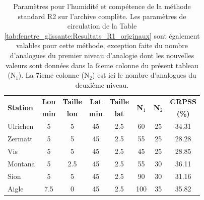 \documentclass[hess]{copernicus}
\begin{document}
\begin{table}[htb]
	\caption{Paramètres pour l'humidité et compétence de la méthode standard R2 sur l'archive complète. Les paramètres de circulation de la Table \ref{tab:fenetre_glissante:Resultats_R1_originaux} sont également valables pour cette méthode, exception faite du nombre d'analogues du premier niveau d'analogie dont les nouvelles valeurs sont données dans la 6ieme colonne du présent tableau (N$_{1}$). La 7ieme colonne (N$_{2}$) est ici le nombre d'analogues du deuxième niveau.}
	\begin{center}
		\begin{tabular}{l c c c c c c c }
			\hline
			\multirow{2}{*}{\textbf{Station}} & \textbf{Lon} & \textbf{Taille} & \textbf{Lat} & \textbf{Taille} & \multirow{2}{*}{\textbf{N$_{1}$}} & \multirow{2}{*}{\textbf{N$_{2}$}} & \textbf{CRPSS} \\ 
			& \textbf{min} & \textbf{lon} & \textbf{min} & \textbf{lat} & & & \textbf{(\%)} \\ 
			\hline
			Ulrichen & 5 & 5 & 45 & 2.5 & 60 & 25 & 34.31 \\ \hline
			Zermatt & 5 & 5 & 45 & 2.5 & 55 & 25 & 28.28 \\ \hline
			Vis & 5 & 5 & 45 & 2.5 & 45 & 25 & 28.85 \\ \hline
			Montana & 5 & 2.5 & 45 & 2.5 & 55 & 30 & 36.11 \\ \hline
			Sion & 5 & 5 & 45 & 2.5 & 90 & 30 & 31.16 \\ \hline
			Aigle & 7.5 & 0 & 45 & 2.5 & 100 & 35 & 35.82 \\ \hline
		\end{tabular}
	\end{center}
	\label{tab:fenetre_glissante:Resultats_R2_originaux}
\end{table}
\end{document}
